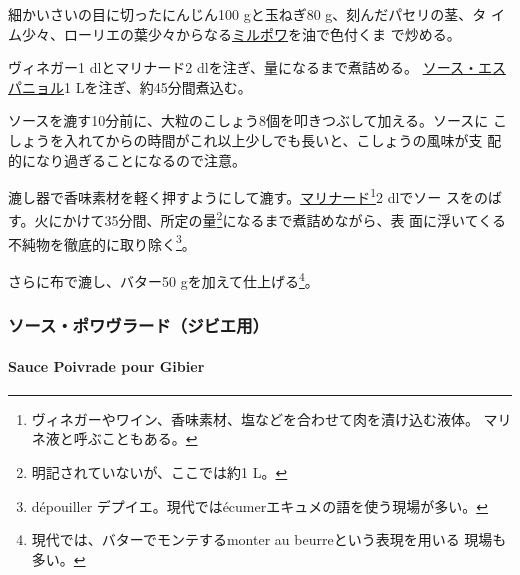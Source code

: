 \begin{recette}
   

細かいさいの目に切ったにんじん100 gと玉ねぎ80 g、刻んだパセリの茎、タ
イム少々、ローリエの葉少々からなる\protect\hyperlink{mirepoix}{ミルポワ}を油で色付くま
で炒める。

ヴィネガー1 dlとマリナード2 dlを注ぎ、\untiers{}量になるまで煮詰める。
\protect\hyperlink{sauce-espagnole}{ソース・エスパニョル}1
Lを注ぎ、約45分間煮込む。

ソースを漉す10分前に、大粒のこしょう8個を叩きつぶして加える。ソースに
こしょうを入れてからの時間がこれ以上少しでも長いと、こしょうの風味が支
配的になり過ぎることになるので注意。

漉し器で香味素材を軽く押すようにして漉す。\href{}{マリナード}\footnote{ヴィネガーやワイン、香味素材、塩などを合わせて肉を漬け込む液体。
  マリネ液と呼ぶこともある。}2 dlでソー
スをのばす。火にかけて35分間、所定の量\footnote{明記されていないが、ここでは約1
  L。}になるまで煮詰めながら、表
面に浮いてくる不純物を徹底的に取り除く\footnote{dépouiller
  デプイエ。現代ではécumerエキュメの語を使う現場が多い。}。

さらに布で漉し、バター50 gを加えて仕上げる\footnote{現代では、バターでモンテするmonter
  au beurreという表現を用いる 現場も多い。}。

\maeaki

\hypertarget{ux30bdux30fcux30b9ux30ddux30efux30f4ux30e9ux30fcux30c9ux30b8ux30d3ux30a8ux7528}{%
\subsubsection{ソース・ポワヴラード（ジビエ用）}\label{ux30bdux30fcux30b9ux30ddux30efux30f4ux30e9ux30fcux30c9ux30b8ux30d3ux30a8ux7528}}

\hypertarget{sauce-poivrade-pour-gibier}{%
\paragraph{Sauce Poivrade pour
Gibier}\label{sauce-poivrade-pour-gibier}}

  


\end{recette}
